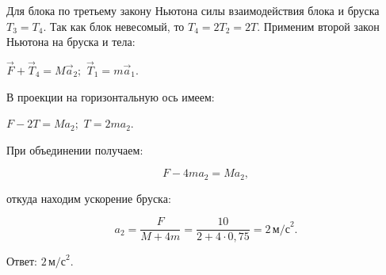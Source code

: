 \documentclass[12pt,a4paper]{article}
\begin{document}
{Для блока по третьему закону Ньютона силы взаимодействия блока и бруска $T_3=T_4.$ Так как блок невесомый, то $T_4=2T_2=2T.$
Применим второй закон Ньютона на бруска и тела:

$\vec F + \vec T_4=M\vec a_2;$
$\vec T_1=m\vec a_1.$

В проекции на горизонтальную ось имеем:

$F - 2T=Ma_2;$
$T=2ma_2.$

При объединении получаем:

\[F - 4ma_2=Ma_2,\]

откуда находим ускорение бруска:

\[a_2= \frac{F}{M + 4m} = \frac{10}{2 + 4 \cdot 0{,}75} =2 \,\text{м/с} ^2 .\]

Ответ: $2\,\text{м/с}^{2}$.
}
\end{document}
